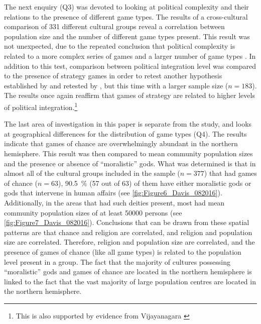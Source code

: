 The next enquiry (Q3) was devoted to looking at political complexity and their relations to the presence of different game types. The results of a cross-cultural comparison of 331 different cultural groups reveal a correlation between population size and the number of different game types present. This result was not unexpected, due to the repeated conclusion that political complexity is related to a more complex series of games and a larger number of game types \parencites[291]{ball1972}[322]{chick1984}[195]{chick1998}{chick2015}{peregrine2008}{roberts1959}. In addition to this test, comparison between political integration level was compared to the presence of strategy games in order to retest another hypothesis established by \textcite{roberts1959} and retested by \textcite{chick1998}, but this time with a larger sample size ($n = 183$). The results once again reaffirm that games of strategy are related to higher levels of political integration.\footnote{This is also supported by evidence from Vijayanagara \parencite{rogersdotter2015}}

The last area of investigation in this paper is separate from the \textcite{roberts1959} study, and looks at geographical differences for the distribution of game types (Q4). The results indicate that games of chance are overwhelmingly abundant in the northern hemisphere. This result was then compared to mean community population sizes and the presence or absence of ``moralistic” gods. What was determined is that in almost all of the cultural groups included in the sample ($n = 377$) that had games of chance ($n = 63$), \SI{90.5}{\percent} (57 out of 63) of them have either moralistic gods or gods that intervene in human affairs (see \cref{fig:Figure6_Davis_082016}). Additionally, in the areas that had such deities present, most had mean community population sizes of at least \num{50000} persons (see \cref{fig:Figure7_Davis_082016}). 
Conclusions that can be drawn from these spatial patterns are that chance and religion are correlated, and religion and population size are correlated. Therefore, religion and population size are correlated, and the presence of games of chance (like all game types) is related to the population level present in a group. 
The fact that the majority of cultures possessing ``moralistic” gods and games of chance are located in the northern hemisphere is linked to the fact that the vast majority of large population centres are located in the northern hemisphere.

